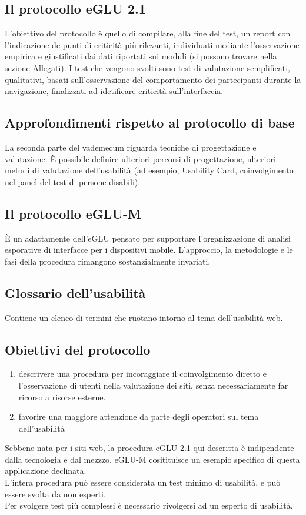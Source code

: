 \documentclass{article}
\begin{document}
\subsection{Il protocollo eGLU 2.1}
L'obiettivo del protocollo è quello di compilare, alla fine del test, un report con l'indicazione de punti di criticità più rilevanti, individuati mediante l'osservazione empirica e giustificati dai dati riportati sui moduli (si possono trovare nella sezione Allegati). I test che vengono svolti sono test di valutazione semplificati, qualitativi, basati sull'osservazione del comportamento dei partecipanti durante la navigazione, finalizzati ad idetificare criticità sull'interfaccia.
\subsection{Approfondimenti rispetto al protocollo di base}
La seconda parte del vademecum riguarda tecniche di progettazione e valutazione. È possibile definire ulteriori percorsi di progettazione, ulteriori metodi di valutazione dell'usabilità (ad esempio, Usability Card, coinvolgimento nel panel del test di persone disabili).
\subsection{Il protocollo eGLU-M}
È un adattamente dell'eGLU pensato per supportare l'organizzazione di analisi esporative di interfacce per i dispositivi mobile. L'approccio, la metodologie e le fasi della procedura rimangono sostanzialmente invariati.
\subsection{Glossario dell'usabilità}
Contiene un elenco di termini che ruotano intorno al tema dell'usabilità web.
\subsection{Obiettivi del protocollo}
\begin{enumerate}
	\item descrivere una procedura per incoraggiare il coinvolgimento diretto e l'osservazione di utenti nella valutazione dei siti, senza necessariamente far ricorso a risorse esterne.
	\item favorire una maggiore attenzione da parte degli operatori sul tema dell'usabilità
\end{enumerate}
Sebbene nata per i siti web, la procedura eGLU 2.1 qui descritta è indipendente dalla tecnologia e dal mezzzo.
eGLU-M  cositituisce un esempio specifico di questa applicazione declinata.\\ 
L'intera procedura può essere considerata un test minimo di usabilità, e può essere svolta da non esperti.\\
Per svolgere test più complessi è necessario rivolgersi ad un esperto di usabilità.
\end{document}
